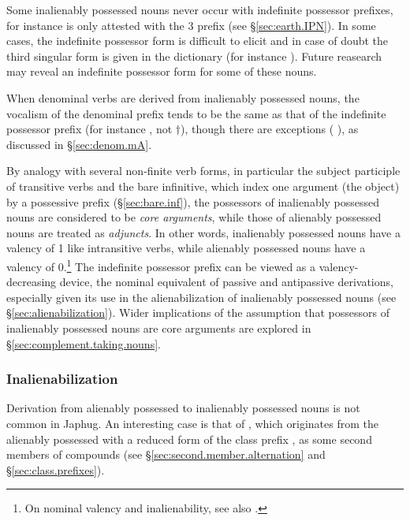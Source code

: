 Some inalienably possessed nouns never occur with indefinite possessor prefixes, for instance  is only attested with the 3\sg{}  prefix (see §\ref{sec:earth.IPN}). In some cases, the indefinite possessor form is difficult to elicit and in case of doubt the third singular form is given in the dictionary \citet{jacques16japhug} (for instance ). Future reasearch may reveal an indefinite possessor form for some of these nouns.

When denominal verbs are derived from inalienably possessed nouns, the vocalism of the denominal prefix tends to be the same as that of the indefinite possessor prefix (for instance  \fl{} , not $\dagger$), though there are exceptions ( \fl{} ), as discussed in §\ref{sec:denom.mA}.

By analogy with several non-finite verb forms, in particular the subject participle of transitive verbs and the bare infinitive, which index one argument (the object) by a possessive prefix (§\ref{sec:bare.inf}), the possessors of inalienably possessed nouns are considered to be \textit{core arguments}, while those of alienably possessed nouns are treated as \textit{adjuncts}. In other words, inalienably possessed nouns have a valency of 1 like intransitive verbs, while alienably possessed nouns have a valency of 0.\footnote{On nominal valency and inalienability, see also \citet[30-31]{gutman18attributive}. } The indefinite possessor prefix can be viewed as a valency-decreasing device, the nominal equivalent of passive and antipassive derivations, especially given its use in the alienabilization of inalienably possessed nouns (see §\ref{sec:alienabilization}). Wider implications of the assumption that possessors of inalienably possessed nouns are core arguments are explored in §\ref{sec:complement.taking.nouns}.

\subsubsection{Inalienabilization} \label{sec:apn.to.ipn}
Derivation from alienably possessed to inalienably possessed nouns is not common in Japhug. An interesting case is that of , which originates from the alienably possessed  with a reduced form  of the class prefix , as some second members of compounds (see §\ref{sec:second.member.alternation} and §\ref{sec:class.prefixes}).

